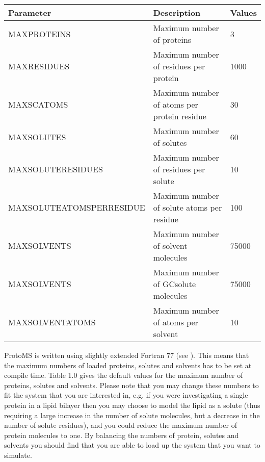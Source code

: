 \documentclass[letterpaper,10pt,english]{sphinxmanual}
\begin{document}
\begin{savenotes}\sphinxattablestart
\centering
{}
\label{\detokenize{protoms:id3}}
\sphinxaftercaption
\begin{tabulary}{\linewidth}[t]{|T|T|T|}
\hline
\sphinxstyletheadfamily 
Parameter
&\sphinxstyletheadfamily 
Description
&\sphinxstyletheadfamily 
Values
\\
\hline
MAXPROTEINS
&
Maximum number of proteins
&
3
\\
\hline
MAXRESIDUES
&
Maximum number of residues per protein
&
1000
\\
\hline
MAXSCATOMS
&
Maximum number of atoms per protein residue
&
30
\\
\hline
MAXSOLUTES
&
Maximum number of solutes
&
60
\\
\hline
MAXSOLUTERESIDUES
&
Maximum number of residues per solute
&
10
\\
\hline
MAXSOLUTEATOMSPERRESIDUE
&
Maximum number of solute atoms per residue
&
100
\\
\hline
MAXSOLVENTS
&
Maximum number of solvent molecules
&
75000
\\
\hline
MAXSOLVENTS
&
Maximum number of GCsolute molecules
&
75000
\\
\hline
MAXSOLVENTATOMS
&
Maximum number of atoms per solvent
&
10
\\
\hline
\end{tabulary}
\par
\sphinxattableend\end{savenotes}


ProtoMS is written using slightly extended Fortran 77 (see {\hyperref[\detokenize{compilation:fortran77}]{}}). This means that the maximum numbers of loaded proteins, solutes and solvents has to be set at compile time. Table 1.0 gives the default values for the maximum number of proteins, solutes and solvents. Please note that you may change these numbers to fit the system that you are interested in, e.g. if you were investigating a single protein in a lipid bilayer then you may choose to model the lipid as a solute (thus requiring a large increase in the number of solute molecules, but a decrease in the number of solute residues), and you could reduce the maximum number of protein molecules to one. By balancing the numbers of protein, solutes and solvents you should find that you are able to load up the system that you want to simulate.
\end{document}
